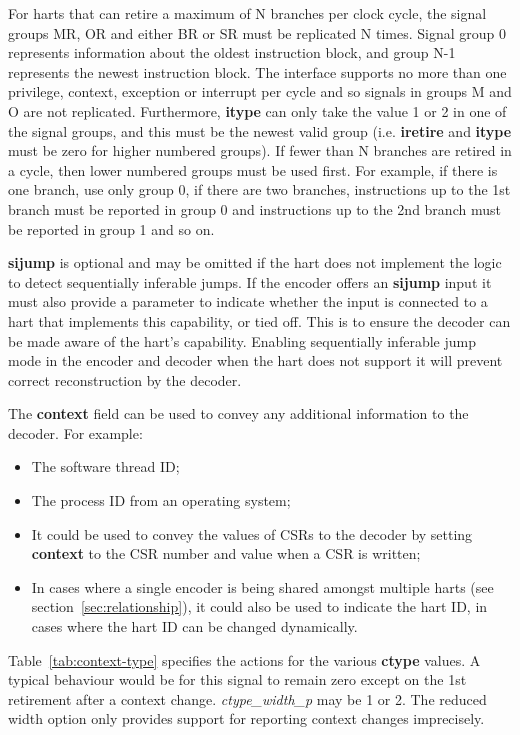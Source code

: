 For harts that can retire a maximum of N branches per clock
cycle, the signal groups MR, OR and either BR or SR must be replicated N times. 
Signal group 0 represents information about the oldest instruction block, and group N-1
represents the newest instruction block. The interface supports no more
than one privilege, context, exception or interrupt per cycle and so signals in
groups M and O are not replicated. Furthermore, \textbf{itype} can only
take the value 1 or 2 in one of the signal groups, and this must be
the newest valid group (i.e. \textbf{iretire} and \textbf{itype} must
be zero for higher numbered groups). If fewer than N branches
are retired in a cycle, then lower numbered groups must be used
first. For example, if there is one branch, use only group 0, if
there are two branches, instructions up to the 1st branch
must be reported in group 0 and instructions up to the 2nd branch
must be reported in group 1 and so on.

\textbf{sijump} is optional and may be omitted if the hart does not implement the logic to detect
sequentially inferable jumps.  If the encoder offers an \textbf{sijump} input it must also provide a
parameter to indicate whether the input is connected to a hart that implements this capability, or
tied off.  This is to ensure the decoder can be made aware of the hart's capability.  Enabling 
sequentially inferable jump mode in the encoder and decoder when the hart does not support it will
prevent correct reconstruction by the decoder. 

The \textbf{context} field can be used to convey any additional information to the decoder.  For example:

\begin{itemize}
  \item The software thread ID;
  \item The process ID from an operating system;
  \item It could be used to convey the values of CSRs to the decoder by setting \textbf{context} to the 
    CSR number and value when a CSR is written;
  \item In cases where a single encoder is being shared amongst multiple harts 
  (see section~\ref{sec:relationship}), it could also be used to indicate the hart ID, in cases where the 
  hart ID can be changed dynamically.
\end{itemize}

Table~\ref{tab:context-type} specifies the actions for the various \textbf{ctype} values.  A typical 
behaviour would be for this signal to remain zero except on the 1st retirement after a context change.
\textit{ctype\_width\_p} may be 1 or 2.  The reduced width option only provides support for reporting
context changes imprecisely.

